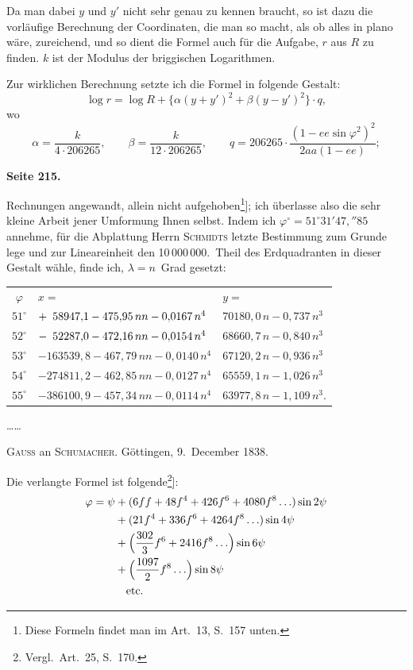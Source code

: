 \documentclass[12pt,a4paper]{article}
\theoremstyle{plain}
\theoremstyle{definition}
\theoremstyle{remark}
\begin{document}
Da man dabei $y$ und $y'$ nicht sehr genau zu kennen braucht, so ist dazu die vorläufige Berechnung der Coordinaten, die man so macht, als ob alles in plano wäre, zureichend, und so dient die Formel auch für die Aufgabe, $r$ aus $R$ zu finden. $k$ ist der Modulus der briggischen Logarithmen.

Zur wirklichen Berechnung setzte ich die Formel in folgende Gestalt:
\[
\log r = \log R + \{\alpha(y + y')^2 + \beta(y - y')^2\} \cdot q,
\]
wo
\[
\alpha = \frac{k}{4 \cdot 206265}, \qquad \beta = \frac{k}{12 \cdot 206265}, \qquad q = 206265 \cdot \frac{(1 - ee \sin \varphi^2)^2}{2aa(1 - ee)};
\]

\newpage
\textbf{Seite 215.}

Rechnungen angewandt, allein nicht aufgehoben\footnote{Diese Formeln findet man im Art.~13, S.~157 unten.}]; ich überlasse also die sehr kleine Arbeit jener Umformung Ihnen selbst. Indem ich $\varphi^{\circ} = 51^{\circ} 31' 47{,}''85$ annehme, für die Abplattung Herrn \textsc{Schmidts} letzte Bestimmung zum Grunde lege und zur Lineareinheit den 10\,000\,000.~Theil des Erdquadranten in dieser Gestalt wähle, finde ich, $\lambda = n$~Grad gesetzt:

\begin{center}
\begin{tabular}{c@{\quad}l@{\qquad}l}
$\varphi$ & $x =$ & $y =$ \\[2pt]
$51^{\circ}$ & $+\hphantom{1}58947{,}1 - 475{,}95\,nn - 0{,}0167\,n^4$ & $70180{,}0\,n - 0{,}737\,n^3$ \\
$52^{\circ}$ & $-\hphantom{1}52287{,}0 - 472{,}16\,nn - 0{,}0154\,n^4$ & $68660{,}7\,n - 0{,}840\,n^3$ \\
$53^{\circ}$ & $-163539{,}8 - 467{,}79\,nn - 0{,}0140\,n^4$ & $67120{,}2\,n - 0{,}936\,n^3$ \\
$54^{\circ}$ & $-274811{,}2 - 462{,}85\,nn - 0{,}0127\,n^4$ & $65559{,}1\,n - 1{,}026\,n^3$ \\
$55^{\circ}$ & $-386100{,}9 - 457{,}34\,nn - 0{,}0114\,n^4$ & $63977{,}8\,n - 1{,}109\,n^3$.
\end{tabular}
\end{center}

\ldots\ldots

\medskip
\textsc{Gauß} an \textsc{Schumacher}. Göttingen, 9.~December 1838.

Die verlangte Formel ist folgende\footnote{Vergl.~Art.~25, S.~170.}]:
\begin{align*}
\varphi = \psi &+ (6ff + 48f^4 + 426f^6 + 4080f^8 \ldots) \sin 2\psi \\
&+ (21f^4 + 336f^6 + 4264f^8 \ldots) \sin 4\psi \\
&+ \Bigl(\frac{302}{3}f^6 + 2416f^8 \ldots\Bigr) \sin 6\psi \\
&+ \Bigl(\frac{1097}{2}f^8 \ldots\Bigr) \sin 8\psi \\
&\quad \text{etc.}
\end{align*}
\end{document}
